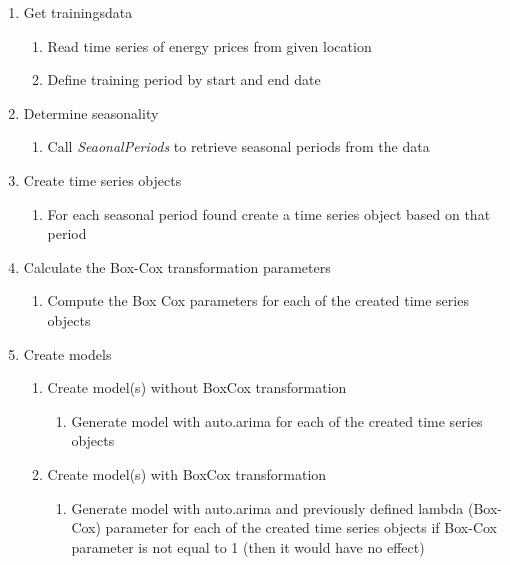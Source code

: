 \begin{enumerate}
	\item Get trainingsdata
	
	\begin{enumerate}
		\item Read time series of energy prices from given location
		\item Define training period by start and end date
	\end{enumerate}
	\item Determine seasonality
	
	\begin{enumerate}
		\item Call \textit{SeaonalPeriods} to retrieve seasonal periods from the data
	\end{enumerate}
	
	\item Create time series objects
	
	\begin{enumerate}
		\item For each seasonal period found create a time series object based on that period
	\end{enumerate}
	
	\item Calculate the Box-Cox transformation parameters
	
	\begin{enumerate}
		\item Compute the Box Cox parameters for each of the created time series objects
	\end{enumerate}
	
	\item Create models
	
	\begin{enumerate}
		\item Create model(s) without BoxCox transformation
		
		\begin{enumerate}
			\item Generate model with auto.arima for each of the created time series objects 
		\end{enumerate}
		
		\item Create model(s) with BoxCox transformation
		
		\begin{enumerate}
			\item Generate model with auto.arima and previously defined lambda (Box-Cox) parameter for each of the created time series objects if Box-Cox parameter is not equal to 1 (then it would have no effect)
		

\end{enumerate}
\end{enumerate}
\end{enumerate}
